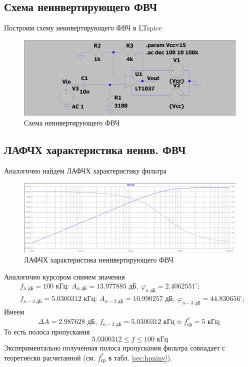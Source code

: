 \documentclass[a4paper, 12pt]{article}
\begin{document}
    \subsection{Схема неинвертирующего ФВЧ}
    Построим схему неинвертирующего ФВЧ в LTspice
    \begin{figure}[H]
        \centering
        \includegraphics[scale=0.22]{scheme2.png}
        \captionsetup{skip=0pt}
        \caption{Схема неинвертирующего ФВЧ}
        \label{fig:scheme2}
    \end{figure}


    \subsection{ЛАФЧХ характеристика неинв. ФВЧ}
    Аналогично найдем ЛАФЧХ характеристику фильтра
    \begin{figure}[H]
        \centering
        \includegraphics[scale=0.46]{2task_lapfr.png}
        \captionsetup{skip=0pt}
        \caption{ЛАФЧХ характеристика неинвертирующего ФВЧ}
        \label{fig:2task_lapfr}
    \end{figure}
    \noindent Аналогично курсором снимем значения
    \begin{align*}
    &f_{n\text{ дБ}}=100\text{ кГц}:\ A_{n\text{ дБ}}=13.977885\text{ дБ},\ \varphi_{n\text{ дБ}}=2.4062551^{\circ};\\
    &f_{n-3\text{ дБ}}=5.0300312 \text{ кГц}:\ A_{n-3\text{ дБ}}=10.990257\text{ дБ},\ \varphi_{n-3\text{ дБ}}=44.830656^{\circ};
    \end{align*}
    Имеем
    $$
    \Delta A=2.987628\text{ дБ},\ f_{n-3\text{ дБ}}=5.0300312\text{ кГц}\approx f_\text{ср}^*=5\text{ кГц};
    $$
    То есть полоса пропускания
    $$
    5.0300312\leq f\leq100\text{ кГц}
    $$
    Экспериментально полученная полоса пропускания фильтра совпадает с теоретиески расчитанной (см. $f_\text{ср}^*$ в табл. \ref{sec:hpninv}).
\end{document}
